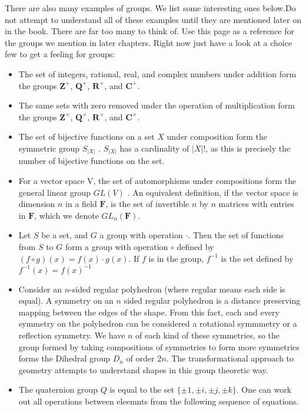 \documentclass[12pt]{amsbook}
\theoremstyle{plain}
\theoremstyle{definition}
\begin{document}
There are also many examples of groups. We list some interesting ones below.Do not attempt to understand all of these examples until they are mentioned later on in the book. There are far too many to think of. Use this page as a reference for the groups we mention in later chapters. Right now just have a look at a choice few to get a feeling for groups:
%
\begin{itemize}
    \item The set of integers, rational, real, and complex numbers under addition form the groups $\mathbf{Z}^+$, $\mathbf{Q}^+$, $\mathbf{R}^+$, and $\mathbf{C}^+$.
    \item The same sets with zero removed under the operation of multiplication form the groups $\mathbf{Z}^\times$, $\mathbf{Q}^\times$, $\mathbf{R}^\times$, and $\mathbf{C}^\times$.
    \item The set of bijective functions on a set $X$ under composition form the symmetric group $S_{|X|}$ . $S_{|X|}$ has a cardinality of $|X|!$, as this is precisely the number of bijective functions on the set.
    \item For a vector space V, the set of automorphisms under compositions form the general linear group $GL(V)$ . An equivalent definition, if the vector space is dimension $n$ in a field $\mathbf{F}$, is the set of invertible $n$ by $n$ matrices with entries in $\mathbf{F}$, which we denote $GL_n(\mathbf{F})$.
    \item Let $S$ be a set, and $G$ a group with operation $\cdotp$. Then the set of functions from $S$ to $G$ form a group with operation $\circ$ defined by $(f \circ g)(x) = f(x) \cdotp g(x)$. If $f$ is in the group, $f^{-1}$ is the set defined by $f^{-1}(x) = f(x)^{-1}$
    \item Consider an $n$-sided regular polyhedron (where regular means each side is equal). A symmetry on an $n$ sided regular polyhedron is a distance preserving mapping between the edges of the shape. From this fact, each and every symmetry on the polyhedron can be considered a rotational symmmetry or a reflection symmetry. We have $n$ of each kind of these symmetries, so the group formed by taking compositions of symmetries to form more symmetries forms the Dihedral group  $D_n$ of order $2n$. The transformational approach to geometry attempts to understand shapes in this group theoretic way.
    \item The quaternion group $Q$  is equal to the set $\{ \pm 1, \pm i, \pm j, \pm k \}$. One can work out all operations between eleemnts from the following sequence of equations.

\end{itemize}
\end{document}
